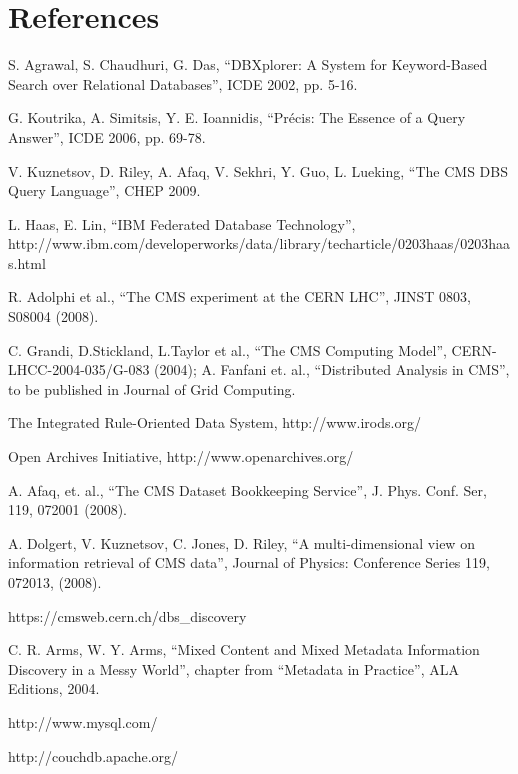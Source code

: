 \documentclass[a4paper]{jpconf}
\begin{document}
\section*{References}
\begin{thebibliography}{9}
S. Agrawal, S. Chaudhuri, G. Das,
``DBXplorer: A System for Keyword-Based Search over Relational Databases'',
ICDE 2002, pp. 5-16.

G. Koutrika, A. Simitsis, Y. E. Ioannidis,
``Pr\'{e}cis: The Essence of a Query Answer'',
ICDE 2006, pp. 69-78.

V. Kuznetsov, D. Riley, A. Afaq, V. Sekhri, Y. Guo, L. Lueking,
``The CMS DBS Query Language'', CHEP 2009.


L. Haas, E. Lin,
``IBM Federated Database Technology'', \\
http://www.ibm.com/developerworks/data/library/techarticle/0203haas/0203haas.html

R. Adolphi et al., 
``The CMS experiment at the CERN LHC'',
JINST 0803, S08004 (2008).

C. Grandi, D.Stickland, L.Taylor et al.,
``The CMS Computing Model'',
CERN-LHCC-2004-035/G-083 (2004);
A. Fanfani et. al., 
``Distributed Analysis in CMS'', 
to be published in Journal of Grid Computing.

The Integrated Rule-Oriented Data System,
http://www.irods.org/

Open Archives Initiative,
http://www.openarchives.org/

A. Afaq, et. al.,
``The CMS Dataset Bookkeeping Service'', 
J. Phys. Conf. Ser, 119, 072001 (2008).

A. Dolgert, V. Kuznetsov, C. Jones, D. Riley, 
``A multi-dimensional view on information retrieval of CMS data'',
Journal of Physics: Conference Series 119, 072013, (2008).

 https://cmsweb.cern.ch/dbs\_discovery

C. R. Arms, W. Y. Arms,
 ``Mixed Content and Mixed Metadata 
Information Discovery in a Messy World'',
chapter from ``Metadata in Practice'', ALA Editions, 2004.

http://www.mysql.com/

http://couchdb.apache.org/


\end{thebibliography}
\end{document}

